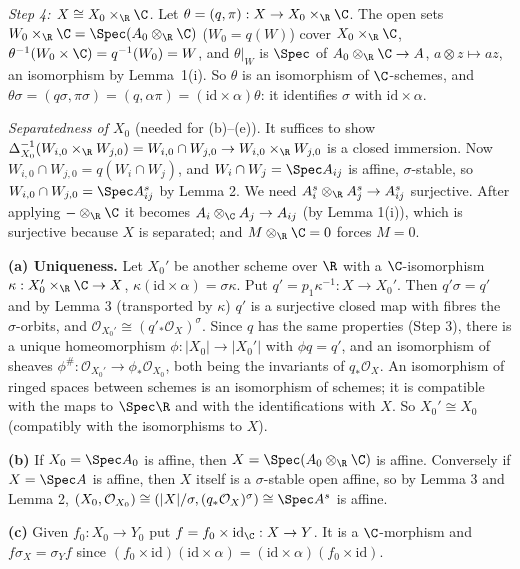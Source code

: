 \documentclass[11pt]{article}
\begin{document}
\emph{Step 4: $X\cong X_0\times_{\R}\C$.} Let $\theta=(q,\pi):X\to X_0\times_{\R}\C$. The open sets $W_0\times_{\R}\C=\Spec(A_0\otimes_{\R}\C)$ ($W_0=q(W)$) cover $X_0\times_{\R}\C$, $\theta^{-1}(W_0\times\C)=q^{-1}(W_0)=W$, and $\theta|_W$ is $\Spec$ of $A_0\otimes_{\R}\C\to A$, $a\otimes z\mapsto az$, an isomorphism by Lemma~1(i). So $\theta$ is an isomorphism of $\C$-schemes, and $\theta\sigma=(q\sigma,\pi\sigma)=(q,\alpha\pi)=(\mathrm{id}\times\alpha)\theta$: it identifies $\sigma$ with $\mathrm{id}\times\alpha$.

\emph{Separatedness of $X_0$} (needed for (b)--(e)). It suffices to show $\Delta_{X_0}^{-1}(W_{i,0}\times_{\R}W_{j,0})=W_{i,0}\cap W_{j,0}\to W_{i,0}\times_{\R}W_{j,0}$ is a closed immersion. Now $W_{i,0}\cap W_{j,0}=q(W_i\cap W_j)$, and $W_i\cap W_j=\Spec A_{ij}$ is affine, $\sigma$-stable, so $W_{i,0}\cap W_{j,0}=\Spec A_{ij}^s$ by Lemma 2. We need $A_i^s\otimes_{\R}A_j^s\to A_{ij}^s$ surjective. After applying $-\otimes_{\R}\C$ it becomes $A_i\otimes_{\C}A_j\to A_{ij}$ (by Lemma 1(i)), which is surjective because $X$ is separated; and $M\otimes_{\R}\C=0$ forces $M=0$.

\textbf{(a) Uniqueness.} Let $X_0'$ be another scheme over $\R$ with a $\C$-isomorphism $\kappa:X_0'\times_{\R}\C\to X$, $\kappa(\mathrm{id}\times\alpha)=\sigma\kappa$. Put $q'=p_1\kappa^{-1}:X\to X_0'$. Then $q'\sigma=q'$ and by Lemma 3 (transported by $\kappa$) $q'$ is a surjective closed map with fibres the $\sigma$-orbits, and $\mathcal O_{X_0'}\cong(q'_*\mathcal O_X)^\sigma$. Since $q$ has the same properties (Step 3), there is a unique homeomorphism $\phi:|X_0|\to|X_0'|$ with $\phi q=q'$, and an isomorphism of sheaves $\phi^\#:\mathcal O_{X_0'}\to\phi_*\mathcal O_{X_0}$, both being the invariants of $q_*\mathcal O_X$. An isomorphism of ringed spaces between schemes is an isomorphism of schemes; it is compatible with the maps to $\Spec\R$ and with the identifications with $X$. So $X_0'\cong X_0$ (compatibly with the isomorphisms to $X$).

\textbf{(b)} If $X_0=\Spec A_0$ is affine, then $X=\Spec(A_0\otimes_{\R}\C)$ is affine. Conversely if $X=\Spec A$ is affine, then $X$ itself is a $\sigma$-stable open affine, so by Lemma 3 and Lemma 2, $(X_0,\mathcal O_{X_0})\cong(|X|/\sigma,(q_*\mathcal O_X)^\sigma)\cong\Spec A^s$ is affine.

\textbf{(c)} Given $f_0:X_0\to Y_0$ put $f=f_0\times\mathrm{id}_{\C}:X\to Y$. It is a $\C$-morphism and $f\sigma_X=\sigma_Yf$ since $(f_0\times\mathrm{id})(\mathrm{id}\times\alpha)=(\mathrm{id}\times\alpha)(f_0\times\mathrm{id})$.
\end{document}
